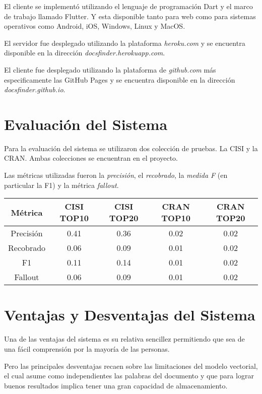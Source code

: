 \documentclass[runningheads,a4paper]{llncs}
\begin{document}
El cliente se implementó utilizando el lenguaje de programación Dart y el marco de trabajo llamado Flutter. Y esta disponible tanto para web como para sistemas operativos como Android, iOS, Windows, Linux y MacOS.

El servidor fue desplegado utilizando la plataforma \textit{heroku.com} y se encuentra disponible en la dirección \textit{docsfinder.herokuapp.com}.

El cliente fue desplegado utilizando la plataforma de \textit{github.com} más especificamente las GitHub Pages y se encuentra disponible en la dirección \textit{docsfinder.github.io}.

\section{Evaluación del Sistema}

Para la evaluación del sistema se utilizaron dos colección de pruebas. La CISI y la CRAN. Ambas colecciones se encuentran en el proyecto.

Las métricas utilizadas fueron la \textit{precisión}, el \textit{recobrado}, la \textit{medida F} (en particular la F1) y la métrica \textit{fallout}.\\

\begin{tabular}{ |c||c|c|c|c|  }
\hline
Métrica & CISI TOP10 & CISI TOP20 & CRAN TOP10 & CRAN TOP20 \\
\hline
Precisión & 0.41 & 0.36 & 0.02 & 0.02 \\
Recobrado & 0.06 & 0.09 & 0.01 & 0.02 \\
F1 & 0.11 & 0.14 & 0.01 & 0.02 \\
Fallout & 0.06 & 0.09 & 0.01 & 0.02 \\
\hline
\end{tabular}

\section{Ventajas y Desventajas del Sistema}

Una de las ventajas del sistema es su relativa sencillez permitiendo que sea de una fácil comprensión por la mayoría de las personas.

Pero las principales desventajas recaen sobre las limitaciones del modelo vectorial, el cual asume como independientes las palabras del documento y que para lograr buenos resultados implica tener una gran capacidad de almacenamiento.
\end{document}
